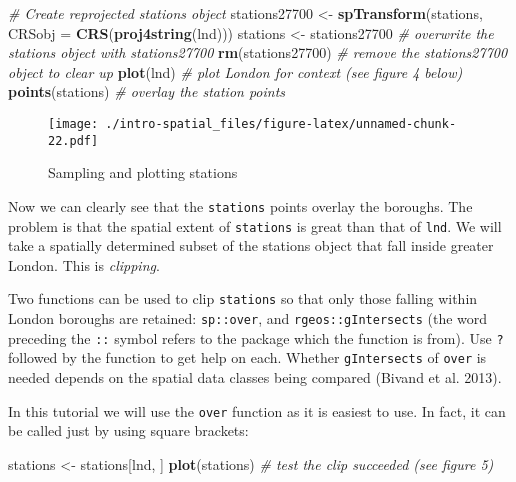 \documentclass[]{article}
\newenvironment{Shaded}{}{}
\newcommand{\KeywordTok}[1]{\textcolor[rgb]{0.00,0.44,0.13}{\textbf{{#1}}}}
\newcommand{\DataTypeTok}[1]{\textcolor[rgb]{0.56,0.13,0.00}{{#1}}}
\newcommand{\StringTok}[1]{\textcolor[rgb]{0.25,0.44,0.63}{{#1}}}
\newcommand{\CommentTok}[1]{\textcolor[rgb]{0.38,0.63,0.69}{\textit{{#1}}}}
\newcommand{\NormalTok}[1]{{#1}}
\begin{document}
\begin{Shaded}
\begin{Highlighting}[]
\CommentTok{# Create reprojected stations object}
\NormalTok{stations27700 <-}\StringTok{ }\KeywordTok{spTransform}\NormalTok{(stations, }\DataTypeTok{CRSobj =} \KeywordTok{CRS}\NormalTok{(}\KeywordTok{proj4string}\NormalTok{(lnd)))}
\NormalTok{stations <-}\StringTok{ }\NormalTok{stations27700 }\CommentTok{# overwrite the stations object with stations27700}
\KeywordTok{rm}\NormalTok{(stations27700) }\CommentTok{# remove the stations27700 object to clear up}
\KeywordTok{plot}\NormalTok{(lnd) }\CommentTok{# plot London for context (see figure 4 below)}
\KeywordTok{points}\NormalTok{(stations) }\CommentTok{# overlay the station points}
\end{Highlighting}
\end{Shaded}

\begin{figure}[htbp]
\centering
\texttt{[image: ./intro-spatial\_files/figure-latex/unnamed-chunk-22.pdf]}
\caption{Sampling and plotting stations}
\end{figure}

Now we can clearly see that the \texttt{stations} points overlay the
boroughs. The problem is that the spatial extent of \texttt{stations} is
great than that of \texttt{lnd}. We will take a spatially determined
subset of the stations object that fall inside greater London. This is
\emph{clipping}.

Two functions can be used to clip \texttt{stations} so that only those
falling within London boroughs are retained: \texttt{sp::over}, and
\texttt{rgeos::gIntersects} (the word preceding the \texttt{::} symbol
refers to the package which the function is from). Use \texttt{?}
followed by the function to get help on each. Whether
\texttt{gIntersects} of \texttt{over} is needed depends on the spatial
data classes being compared (Bivand et al. 2013).

In this tutorial we will use the \texttt{over} function as it is easiest
to use. In fact, it can be called just by using square brackets:

\begin{Shaded}
\begin{Highlighting}[]
\NormalTok{stations <-}\StringTok{ }\NormalTok{stations[lnd, ]}
\KeywordTok{plot}\NormalTok{(stations) }\CommentTok{# test the clip succeeded (see figure 5)}
\end{Highlighting}
\end{Shaded}
\end{document}
